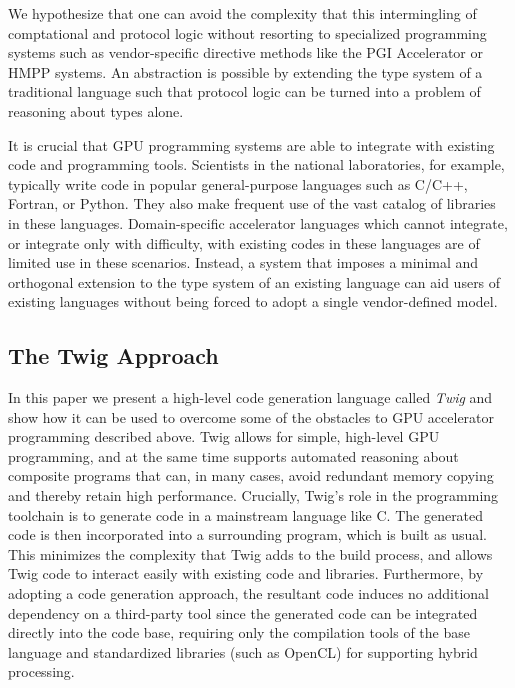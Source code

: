 We hypothesize that one can avoid the complexity that this intermingling
of comptational and protocol logic without resorting to specialized
programming systems such as vendor-specific directive methods like the
PGI Accelerator or HMPP systems.  An abstraction is possible by
extending the type system of a traditional language such that protocol logic
can be turned into a problem of reasoning about types alone.  


It is crucial that GPU programming systems are able to integrate with
existing code and programming tools. Scientists in the national
laboratories, for example, typically write code in popular
general-purpose languages such as C/C++, Fortran, or Python. They also
make frequent use of the vast catalog of libraries in these
languages. Domain-specific accelerator languages which cannot
integrate, or integrate only with difficulty, with existing codes in
these languages are of limited use in these scenarios.  Instead, a
system that imposes a minimal and orthogonal extension to the type
system of an existing language can aid users of existing languages
without being forced to adopt a single vendor-defined model.

\subsection{The Twig Approach}

In this paper we present a high-level code generation language called
\emph{Twig} and show how it can be used to overcome some of the
obstacles to GPU accelerator programming described above. Twig allows
for simple, high-level GPU programming, and at the same time supports
automated reasoning about composite programs that can, in many cases,
avoid redundant memory copying and thereby retain high
performance. Crucially, Twig's role in the programming toolchain is to
generate code in a mainstream language like C. The generated code is
then incorporated into a surrounding program, which is built as
usual. This minimizes the complexity that Twig adds to the build
process, and allows Twig code to interact easily with existing code
and libraries.  Furthermore, by adopting a code generation approach,
the resultant code induces no additional dependency on a third-party
tool since the generated code can be integrated directly into the code
base, requiring only the compilation tools of the base language and
standardized libraries (such as OpenCL) for supporting hybrid
processing.

